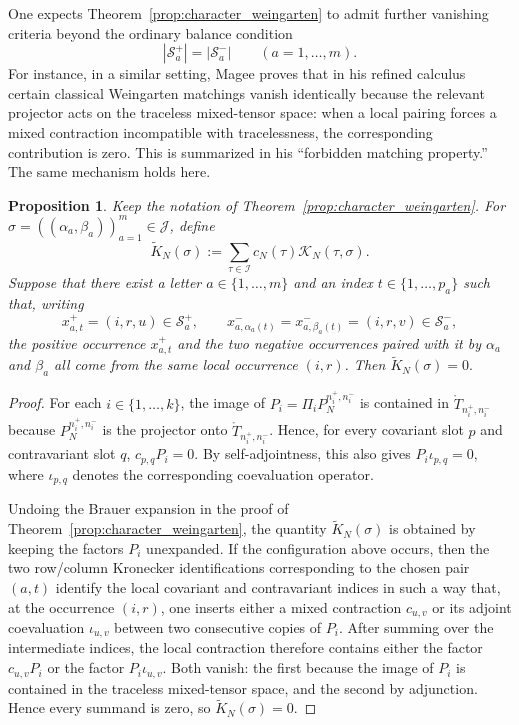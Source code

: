 \documentclass[11pt,a4paper,reqno]{article}
\newtheorem{proposition}[theorem]{Proposition}
\theoremstyle{definition}
\theoremstyle{remark}
\newcommand\TT{{\mathring{T}}}
\begin{document}
One expects Theorem~\ref{prop:character_weingarten} to admit further vanishing criteria beyond the ordinary balance condition
\[
|\mathcal{S}_a^+|=|\mathcal{S}_a^-|\qquad (a=1,\dots,m).
\]
For instance, in a similar setting, Magee \cite{Mag2} proves that in his refined calculus certain classical Weingarten matchings vanish identically because the relevant projector acts on the traceless mixed-tensor space: when a local pairing forces a mixed contraction incompatible with tracelessness, the corresponding contribution is zero. This is summarized in his ``forbidden matching property.'' The same mechanism holds here.

\begin{proposition}\label{prop:elementary-forbidden}
Keep the notation of Theorem~\ref{prop:character_weingarten}. For $\sigma=((\alpha_a,\beta_a))_{a=1}^m\in\mathcal J$,
define
\[
\widetilde K_N(\sigma):=\sum_{\tau\in \mathcal I} c_N(\tau)\mathcal K_N(\tau,\sigma).
\]
Suppose that there exist a letter $a\in\{1,\dots,m\}$ and an index $t\in\{1,\dots,p_a\}$ such that, writing
\[
x_{a,t}^+=(i,r,u)\in\mathcal S_a^+,\qquad x_{a,\alpha_a(t)}^-=x_{a,\beta_a(t)}^-=(i,r,v)\in\mathcal S_a^-,
\]
the positive occurrence $x_{a,t}^+$ and the two negative occurrences paired with it by $\alpha_a$ and $\beta_a$ all come from the same local occurrence $(i,r)$. Then $\widetilde K_N(\sigma)=0.$
\end{proposition}

\begin{proof}
For each $i\in\{1,\dots,k\}$,
the image of $P_i=\Pi_i P_N^{n_i^+,n_i^-}$ is contained in $\TT_{n_i^+,n_i^-}$ because $P_N^{n_i^+,n_i^-}$ is the projector onto $\TT_{n_i^+,n_i^-}$. Hence, for every covariant slot $p$ and contravariant slot $q$, $c_{p,q}P_i=0.$ By self-adjointness, this also gives $P_i\iota_{p,q}=0,$ where $\iota_{p,q}$ denotes the corresponding coevaluation operator.

Undoing the Brauer expansion in the proof of Theorem~\ref{prop:character_weingarten}, the quantity $\widetilde K_N(\sigma)$ is obtained by keeping the factors $P_i$ unexpanded. If the configuration above occurs, then the two row/column Kronecker identifications corresponding to the chosen pair $(a,t)$ identify the local covariant and contravariant indices in such a way that, at the occurrence $(i,r)$, one inserts either a mixed contraction $c_{u,v}$ or its adjoint coevaluation $\iota_{u,v}$ between two consecutive copies of $P_i$. After summing over the intermediate indices, the local contraction therefore contains either the factor $c_{u,v}P_i$ or the factor $P_i\iota_{u,v}$.  Both vanish: the first because the image of $P_i$ is contained in the traceless mixed-tensor space, and the second by adjunction. Hence every summand is zero, so $\widetilde K_N(\sigma)=0$.
\end{proof}
\end{document}
